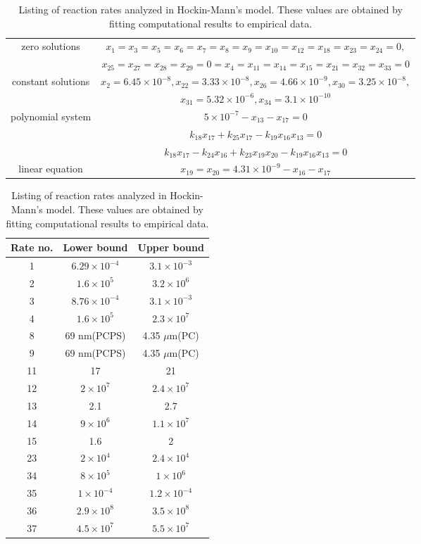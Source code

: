 \begin{table}
\begin{center}
\caption{Steady state solutions by setting free variables in Table
\ref{steady21} to zeros}\label{steady22}\vspace{3mm}
\begin{tabular}{|c|c|}\hline
zero solutions&$x_1=x_3=x_5=x_6=x_7=x_8=x_9=x_{10}=x_{12}=x_{18}=x_{23}=x_{24}=0,$\\
& $x_{25}=x_{27}=x_{28}=x_{29}=0=x_4=x_{11}=
 x_{14}=x_{15}=x_{21}=x_{32}=x_{33}=0$\\\hline
constant solutions&
$x_{2}=6.45\times10^{-8},x_{22}=3.33\times10^{-8},x_{26}=4.66\times10^{-9},x_{30}=3.25\times
10^{-8},$ \\
&$x_{31}=5.32\times10^{-6},x_{34}=3.1\times 10^{-10}$\\\hline
polynomial system &$
5\times10^{-7}-x_{13}-x_{17}=0$\\
&$k_{18}x_{17}+k_{25}x_{17}-k_{19}x_{16}x_{13}=0$\\&$k_{18}x_{17}-k_{24}x_{16}+k_{23}x_{19}x_{20}-k_{19}x_{16}x_{13}=0$\\\hline
linear
equation&$x_{19}=x_{20}=4.31\times10^{-9}-x_{16}-x_{17}$\\\hline
\end{tabular}

\caption{Listing of reaction rates analyzed in Hockin-Mann's model.
These values are obtained by fitting computational results to
empirical data. } \vspace{3mm} \label{reactrate}
\begin{tabular}{|c|c|c|}\hline
Rate no.& Lower bound& Upper bound\\\hline 1& $6.29\times 10^{-4}$&
$3.1\times 10^{-3}$\\\hline 2& $1.6\times 10^{5}$& $3.2\times
10^{6}$\\\hline 3& $8.76\times 10^{-4}$& $3.1\times
10^{-3}$\\\hline4& $1.6\times 10^{5}$& $2.3\times 10^{7}$\\\hline 8&
69 nm(PCPS)& 4.35 $\mu$m(PC)\\\hline 9& 69 nm(PCPS)& 4.35
$\mu$m(PC)\\\hline 11& 17 & 21\\\hline
 12&
$2\times 10^7$& $2.4\times 10^7$\\\hline
 13&
2.1& 2.7\\\hline
 14&$9\times10^6$& $1.1\times10^7$\\\hline
 15&1.6& 2\\\hline
 23&$2\times10^4$& $2.4\times10^4$\\\hline
 34&$8\times10^5$& $1\times10^6$\\\hline
  35&$1\times10^{-4}$& $1.2\times10^{-4}$\\\hline
 36&$2.9\times10^8$& $3.5\times10^8$\\\hline
 37&$4.5\times10^7$& $5.5\times10^7$\\\hline
\end{tabular}
\end{center}
\end{table}
